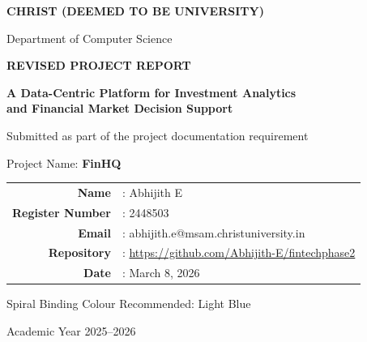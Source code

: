 \documentclass[12pt,a4paper]{report}
\makeatletter
\newcommand{\projecttitle}{A Data-Centric Platform for Investment Analytics\\and Financial Market Decision Support}
\newcommand{\projectshort}{FinHQ}
\newcommand{\studentname}{Abhijith E}
\newcommand{\regno}{2448503}
\newcommand{\studentmail}{abhijith.e@msam.christuniversity.in}
\newcommand{\reportdate}{March 8, 2026}
\newcommand{\repolink}{https://github.com/Abhijith-E/fintechphase2}
\makeatother
\begin{document}
\begin{titlepage}
\thispagestyle{empty}
\centering
\vspace*{0.55in}
{\fontsize{16}{18}\selectfont\bfseries CHRIST (DEEMED TO BE UNIVERSITY)\par}
\vspace{0.08in}
{\fontsize{12}{14}\selectfont Department of Computer Science\par}
\vspace{0.4in}
{\fontsize{16}{18}\selectfont\bfseries REVISED PROJECT REPORT\par}
\vspace{0.3in}
{\fontsize{16}{18}\selectfont\bfseries \projecttitle\par}
\vspace{0.28in}
{\fontsize{12}{14}\selectfont Submitted as part of the project documentation requirement\par}
\vspace{0.25in}
{\fontsize{12}{14}\selectfont Project Name: \textbf{\projectshort}\par}
\vspace{0.3in}
\begin{tabular}{rl}
\textbf{Name} & : \studentname \\
\textbf{Register Number} & : \regno \\
\textbf{Email} & : \studentmail \\
\textbf{Repository} & : \url{\repolink} \\
\textbf{Date} & : \reportdate \\
\end{tabular}
\vfill
{\fontsize{12}{14}\selectfont Spiral Binding Colour Recommended: Light Blue\par}
\vspace{0.2in}
{\fontsize{12}{14}\selectfont Academic Year 2025--2026\par}
\end{titlepage}
\end{document}
